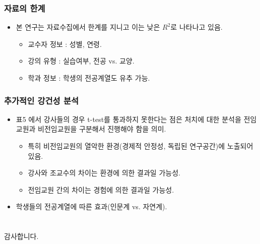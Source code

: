 \documentclass[aspectratio=169,xcolor=dvipsnames,handout]{beamer}
\begin{document}
\begin{frame}
    \frametitle{자료의 한계}
    \begin{itemize}[<+->]
        \item 본 연구는 자료수집에서 한계를 지니고 이는 낮은 $R^2$로 나타나고 있음.
            \begin{itemize}[<+->]
                \item 교수자 정보 : 성별, 연령.
                \item 강의 유형 : 실습여부, 전공 vs. 교양.
                \item 학과 정보 : 학생의 전공계열도 유추 가능.
            \end{itemize}
    \end{itemize}
\end{frame}

\begin{frame}
    \frametitle{추가적인 강건성 분석}
    \begin{itemize}[<+->]
        \item 표5 에서 강사들의 경우 t-test를 통과하지 못한다는 점은 처치에 대한 분석을 전임교원과 비전임교원을 구분해서 진행해야 함을 의미.
            \begin{itemize}[<+->]
                \item 특히 비전임교원의 열악한 환경(경제적 안정성, 독립된 연구공간)에 노출되어 있음. 
                \item 강사와 조교수의 차이는 환경에 의한 결과일 가능성.
                \item 전임교원 간의 차이는 경험에 의한 결과일 가능성.
            \end{itemize}
        \item 학생들의 전공계열에 따른 효과(인문계 vs. 자연계).
    \end{itemize}
\end{frame}




\section*{}%
\begin{frame}
    \centering
    \huge
    감사합니다.
\end{frame}

\end{document}
